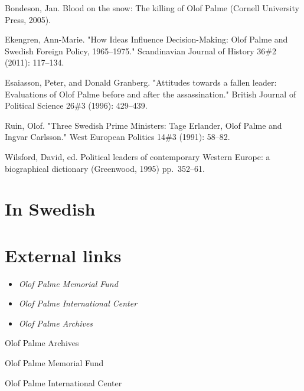 Bondeson, Jan. Blood on the snow: The killing of Olof Palme (Cornell
University Press, 2005).

Ekengren, Ann-Marie. "How Ideas Influence Decision-Making: Olof Palme
and Swedish Foreign Policy, 1965--1975." Scandinavian Journal of History
36\#2 (2011): 117--134.

Esaiasson, Peter, and Donald Granberg. "Attitudes towards a fallen
leader: Evaluations of Olof Palme before and after the assassination."
British Journal of Political Science 26\#3 (1996): 429--439.

Ruin, Olof. "Three Swedish Prime Ministers: Tage Erlander, Olof Palme
and Ingvar Carlsson." West European Politics 14\#3 (1991): 58--82.

Wilsford, David, ed. Political leaders of contemporary Western Europe: a
biographical dictionary (Greenwood, 1995) pp.~352--61.

\section{In Swedish}\label{in-swedish}

\section{External links}\label{external-links}

\begin{itemize}
\item
  \emph{Olof Palme Memorial Fund}
\item
  \emph{Olof Palme International Center}
\item
  \emph{Olof Palme Archives}
\end{itemize}

Olof Palme Archives

Olof Palme Memorial Fund

Olof Palme International Center
